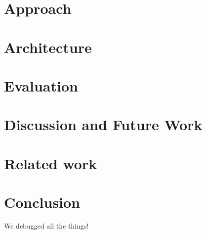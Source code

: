 \documentclass{sig-alternate-10pt}
\begin{document}
\section{Approach}
\label{sec:approach}


\section{Architecture}
\label{sec:architecture}


\section{Evaluation}
\label{sec:evaluation}


\section{Discussion and Future Work}
\label{sec:future_work}


\section{Related work}
\label{sec:related_work}


\section{Conclusion}

We debugged all the things!




%
\end{document}

